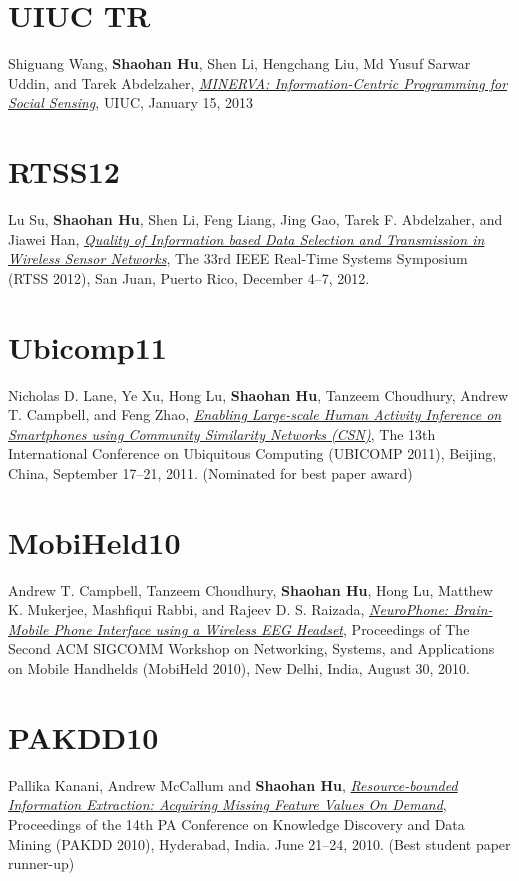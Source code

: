 \section{\sc UIUC TR}\hypertarget{wang2013uiuc}{}
Shiguang Wang, \textbf{Shaohan Hu}, Shen Li, Hengchang Liu, Md Yusuf
Sarwar Uddin, and Tarek Abdelzaher, \href{https://www.ideals.illinois.edu/handle/2142/42511}{\emph{MINERVA: Information-Centric
  Programming for Social Sensing}}, \textsf{UIUC}, January 15, 2013

\section{\sc RTSS12}\hypertarget{su2012rtss}{}
Lu Su, \textbf{Shaohan Hu}, Shen Li, Feng Liang, Jing Gao, Tarek
F. Abdelzaher, and Jiawei Han, \href{http://ieeexplore.ieee.org/xpl/articleDetails.jsp?tp=&arnumber=6424815}{\emph{Quality of Information based Data
  Selection and Transmission in Wireless Sensor Networks}}, \textsf{The
  33rd IEEE Real-Time Systems Symposium (RTSS 2012)}, San Juan, Puerto
Rico, December 4--7, 2012.

\section{\sc Ubicomp11}\hypertarget{lane2011ubicomp}{}
Nicholas D. Lane, Ye Xu, Hong Lu, \textbf{Shaohan Hu}, Tanzeem
Choudhury, Andrew T. Campbell, and Feng Zhao, \href{http://portal.acm.org/citation.cfm?id=2030160}{\emph{Enabling
  Large-scale Human Activity Inference on Smartphones using Community
  Similarity Networks (CSN)}}, \textsf{The 13th International
  Conference on Ubiquitous Computing (UBICOMP 2011)}, Beijing, China,
September 17--21, 2011. (Nominated for best paper award)

\section{\sc MobiHeld10}\hypertarget{campbell2010mobiheld}{}
Andrew T. Campbell, Tanzeem Choudhury, \textbf{Shaohan Hu}, Hong Lu,
Matthew K. Mukerjee, Mashfiqui Rabbi, and Rajeev D. S. Raizada,
\href{http://portal.acm.org/citation.cfm?id=1851326}{\emph{NeuroPhone: Brain-Mobile Phone Interface using a Wireless EEG
  Headset}}, \textsf{Proceedings of The Second ACM SIGCOMM Workshop on
  Networking, Systems, and Applications on Mobile Handhelds (MobiHeld
  2010)}, New Delhi, India, August 30, 2010.

\section{\sc PAKDD10}\hypertarget{kanani2010pakdd}{}
Pallika Kanani, Andrew McCallum and \textbf{Shaohan Hu},
\href{http://www.springerlink.com/content/j41w758434321108}{\emph{Resource-bounded Information Extraction: Acquiring Missing
  Feature Values On Demand}}, \textsf{Proceedings of the 14th PA
  Conference on Knowledge Discovery and Data Mining (PAKDD 2010)},
Hyderabad, India. June 21--24, 2010. (Best student paper runner-up)

